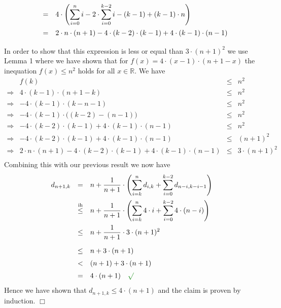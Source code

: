 \documentclass{article}
\newcommand{\green}[1]{{\color{darkgreen}#1}}
\newcommand{\ds}{\displaystyle}
\newcommand{\qed}{\hspace*{\fill} $\Box$ \vspace*{0.2cm}}
\begin{document}
\begin{enumerate}
$$\begin{array}{{lcl}}
              &=& \ds 4\cdot \left(\sum\limits_{i=0}^n i - 2 \cdot\sum\limits_{i=0}^{k-2} i - (k-1) + (k-1) \cdot n \right)
                   \\[0.5cm]
              &=& \ds 2 \cdot n \cdot (n+1) - 4 \cdot (k-2) \cdot (k-1) + 4 \cdot (k-1) \cdot (n-1) \\[0.2cm] 
            \end{array}
            $$
            In order to show that this expression is less or equal than $3 \cdot (n+1)^2$ we use Lemma 1 where
            we have shown that for $f(x) = 4 \cdot (x - 1) \cdot (n + 1 - x)$ the inequation $f(x) \leq n^2$
            holds for all $x \in \mathbb{R}$.  We have
            $$\begin{array}{crcl}
                          & f(k) & \leq & n^2  \\[0.2cm]
              \Rightarrow & 4 \cdot (k - 1) \cdot (n + 1 - k) & \leq & n^2 \\[0.2cm]
              \Rightarrow & -4 \cdot (k - 1) \cdot (k - n - 1) & \leq & n^2 \\[0.2cm]
              \Rightarrow & - 4 \cdot (k-1) \cdot \bigl((k-2) - (n-1) \bigr)
                          & \leq &  n^2 \\[0.2cm]
              \Rightarrow & - 4 \cdot (k-2) \cdot (k-1) + 4 \cdot (k-1) \cdot (n-1)
                          & \leq &  n^2 \\[0.2cm]
              \Rightarrow & - 4 \cdot (k-2) \cdot (k-1) + 4 \cdot (k-1) \cdot (n-1)
                          & \leq &  (n+1)^2 \\[0.2cm]
              \Rightarrow & \ds 2 \cdot n \cdot (n+1) - 4 \cdot (k-2) \cdot (k-1) + 4 \cdot (k-1) \cdot (n-1)
                          & \leq & 3 \cdot (n+1)^2 \\[0.2cm]
              \end{array}
            $$  
            Combining this with our previous result we now have
            $$
            \begin{array}{{lcl}}
              d_{n+1,k} & = & \ds n + \frac{1}{n+1} \cdot \left(\sum\limits_{i=k}^n d_{i,k} + \sum\limits_{i=0}^{k-2}
                              d_{n-i,k-i-1}\right)  \\[0.5cm]
                      & \stackrel{\mathrm{ih}}{\leq} & \ds
                        n + \frac{1}{n+1} \cdot \left(\sum\limits_{i=k}^n 4 \cdot i + \sum\limits_{i=0}^{k-2}
                                                       4 \cdot (n-i) \right)  \\[0.5cm]
                        & \leq & \ds n + \frac{1}{n+1} \cdot 3 \cdot (n+1)^2 \\[0.5cm]
                        & \leq & n + 3 \cdot (n+1) \\[0.2cm]
                        & <  & (n + 1) + 3 \cdot (n+1) \\[0.2cm]
                        & =  & 4 \cdot (n+1)  \quad \mbox{\green{$\surd$}}
            \end{array}
            $$
            Hence we have shown that $d_{n+1,k} \leq 4 \cdot (n+1)$ and the claim is proven by induction. \qed
          \end{enumerate}
\end{document}
